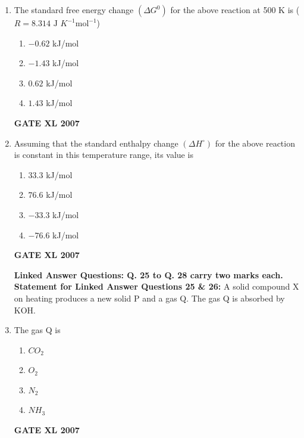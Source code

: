 \documentclass[journal,12pt,onecolumn]{IEEEtran}
\begin{document}
\begin{enumerate}
    \item The standard free energy change $(\Delta G^{0})$ for the above reaction at 500 K is ($R = 8.314 \text{ J } K^{-1} \text{mol}^{-1}$) 
    \begin{multicols}{4}
        \begin{enumerate} 
            \item $-0.62$ kJ/mol
            \item $-1.43$ kJ/mol
            \item $0.62$ kJ/mol
            \item $1.43$ kJ/mol
        \end{enumerate}
    \end{multicols}
	    \hfill \textbf{GATE XL 2007}

    \item Assuming that the standard enthalpy change $(\Delta H^{\circ})$ for the above reaction is constant in this temperature range, its value is 
    \begin{multicols}{4}
        \begin{enumerate} 
            \item $33.3$ kJ/mol
            \item $76.6$ kJ/mol
            \item $-33.3$ kJ/mol
            \item $-76.6$ kJ/mol
        \end{enumerate}
    \end{multicols}
	    \hfill \textbf{GATE XL 2007}


\textbf{Linked Answer Questions: Q. 25 to Q. 28 carry two marks each.}
\noindent\textbf{Statement for Linked Answer Questions 25 \& 26:}
A solid compound X on heating produces a new solid P and a gas Q. The gas Q is absorbed by KOH.


    \item The gas Q is 
    \begin{multicols}{4}
        \begin{enumerate} 
            \item $CO_{2}$
            \item $O_{2}$
            \item $N_{2}$
            \item $NH_{3}$
        \end{enumerate}
    \end{multicols}
	    \hfill \textbf{GATE XL 2007}


\end{enumerate}
\end{document}
